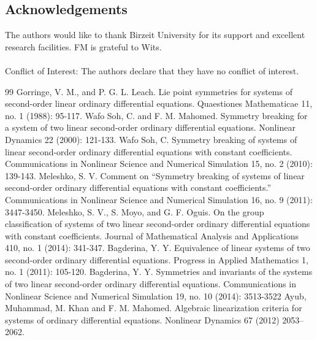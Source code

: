 \documentclass[12pt]{article}
\begin{document}
\subsection*{Acknowledgements}
The authors would like to thank Birzeit University for its support and excellent research facilities. FM is grateful to Wits.\\\\
Conflict of Interest: The authors declare that they have no conflict of interest.
\begin{thebibliography}{99}
 Gorringe, V. M., and P. G. L. Leach. Lie point symmetries for systems of second-order linear ordinary differential equations. Quaestiones Mathematicae 11, no. 1 (1988): 95-117.
  Wafo Soh, C. and F. M. Mahomed. Symmetry breaking for a system of two linear second-order ordinary differential equations. Nonlinear Dynamics 22 (2000): 121-133.
 Wafo Soh, C. Symmetry breaking of systems of linear second-order ordinary differential equations with constant coefficients. Communications in Nonlinear Science and Numerical Simulation 15, no. 2 (2010): 139-143.
 Meleshko, S. V. Comment on “Symmetry breaking of systems of linear second-order ordinary differential equations with constant coefficients.” Communications in Nonlinear Science and Numerical Simulation 16, no. 9 (2011): 3447-3450.
 Meleshko, S. V., S. Moyo, and G. F. Oguis. On the group classification of systems of two linear second-order ordinary differential equations with constant coefficients. Journal of Mathematical Analysis and Applications 410, no. 1 (2014): 341-347.
 Bagderina, Y. Y. Equivalence of linear systems of two second-order ordinary differential equations. Progress in Applied Mathematics 1, no. 1 (2011): 105-120.
 Bagderina, Y. Y. Symmetries and invariants of the systems of two linear second-order
ordinary differential equations. Communications in Nonlinear Science and Numerical Simulation 19, no. 10 (2014): 3513-3522
  Ayub, Muhammad, M. Khan and F. M. Mahomed. Algebraic linearization criteria for systems of ordinary differential equations. Nonlinear Dynamics  67 (2012) 2053–2062.

\end{thebibliography}
\end{document}
